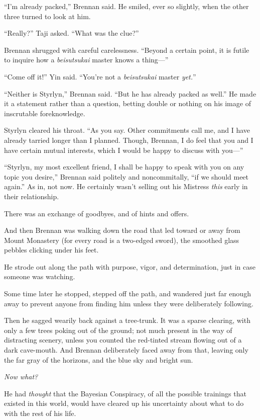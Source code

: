 {
 ``I'm already
packed,'' Brennan said. He smiled, ever so slightly,
when the other three turned to look at him.}

{
 ``Really?'' Taji asked.
``What was the clue?''}

{
 Brennan shrugged with careful carelessness.
``Beyond a certain point, it is futile to inquire how
a \textit{beisutsukai} master knows a thing---''}

{
 ``Come off it!'' Yin said.
``You're not a \textit{beisutsukai}
master \textit{yet.}''}

{
 ``Neither is Styrlyn,'' Brennan
said. ``But he has already packed as
well.'' He made it a statement rather than a
question, betting double or nothing on his image of inscrutable
foreknowledge.}

{
 Styrlyn cleared his throat. ``As you say. Other
commitments call me, and I have already tarried longer than I planned.
Though, Brennan, I do feel that you and I have certain mutual
interests, which I would be happy to discuss with
you---''}

{
 ``Styrlyn, my most excellent friend, I shall be
happy to speak with you on any topic you desire,''
Brennan said politely and noncommitally, ``if we
should meet again.'' As in, not now. He certainly
wasn't selling out his Mistress \textit{this} early in
their relationship.}

{
 There was an exchange of goodbyes, and of hints and offers.}

{
 And then Brennan was walking down the road that led toward or away
from Mount Monastery (for every road is a two-edged sword), the
smoothed glass pebbles clicking under his feet.}

{
 He strode out along the path with purpose, vigor, and
determination, just in case someone was watching.}

{
 Some time later he stopped, stepped off the path, and wandered
just far enough away to prevent anyone from finding him unless they
were deliberately following.}

{
 Then he sagged wearily back against a tree-trunk. It was a sparse
clearing, with only a few trees poking out of the ground; not much
present in the way of distracting scenery, unless you counted the
red-tinted stream flowing out of a dark cave-mouth. And Brennan
deliberately faced away from that, leaving only the far gray of the
horizons, and the blue sky and bright sun.}

{
 \textit{Now what?}}

{
 He had \textit{thought} that the Bayesian Conspiracy, of all the
possible trainings that existed in this world, would have cleared up
his uncertainty about what to do with the rest of his life.}

